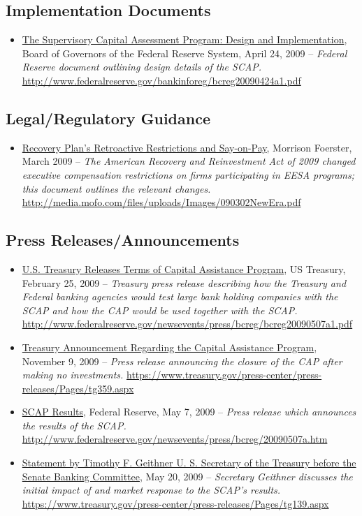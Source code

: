 \documentclass[12pt]{article}
\begin{document}
\subsection{Implementation Documents}
\begin{itemize}
\item
\ul{The
  Supervisory Capital Assessment Program: Design and Implementation},
  Board of Governors of the Federal Reserve System, April 24, 2009 -- \emph{Federal Reserve document outlining design details of the SCAP.} \url{http://www.federalreserve.gov/bankinforeg/bcreg20090424a1.pdf}
\end{itemize}

\subsection{Legal/Regulatory Guidance}

\begin{itemize}
\item
\ul{Recovery Plan's Retroactive Restrictions and Say-on-Pay}, Morrison Foerster, March 2009 -- \emph{The American Recovery and Reinvestment Act of 2009 changed executive compensation restrictions on firms participating in EESA programs; this document outlines the relevant changes.} \url{http://media.mofo.com/files/uploads/Images/090302NewEra.pdf}
\end{itemize}

\subsection{Press Releases/Announcements}

\begin{itemize}
\item
\ul{U.S. Treasury Releases Terms of Capital Assistance Program}, US Treasury, February 25, 2009 -- \emph{Treasury press release describing how the Treasury and Federal banking agencies would test large bank holding companies with the SCAP and how the CAP would be used together with the SCAP.} \url{http://www.federalreserve.gov/newsevents/press/bcreg/bcreg20090507a1.pdf}
\item
\ul{ Treasury Announcement Regarding the Capital Assistance Program}, November 9, 2009 -- \emph{Press release announcing the closure of the CAP after making no investments.} \url{https://www.treasury.gov/press-center/press-releases/Pages/tg359.aspx}
\item
\ul{SCAP
  Results}, Federal Reserve, May 7, 2009 -- \emph{Press release which
  announces the results of the SCAP.} \url{http://www.federalreserve.gov/newsevents/press/bcreg/20090507a.htm}
\item
\ul{Statement
  by Timothy F. Geithner U. S. Secretary of the Treasury before the
  Senate Banking Committee}, May 20, 2009 -- \emph{Secretary Geithner
  discusses the initial impact of and market response to the SCAP's
  results.} \url{https://www.treasury.gov/press-center/press-releases/Pages/tg139.aspx}
\end{itemize}
\end{document}
